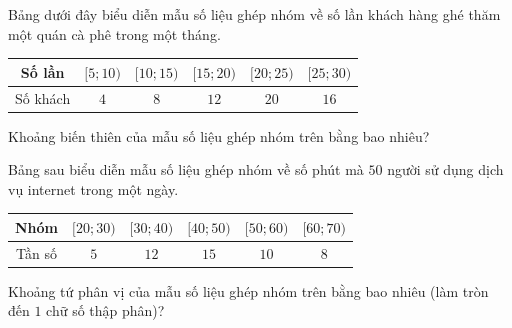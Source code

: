\begin{ex}%
	Bảng dưới đây biểu diễn mẫu số liệu ghép nhóm về số lần khách hàng ghé thăm một quán cà phê trong một tháng.
	\begin{center}
		\begin{tabular}{|c|c|c|c|c|c|}
			\hline Số lần & $[5 ; 10)$ & $[10 ; 15)$ & $[15 ; 20)$ & $[20 ; 25)$ & $[25 ; 30)$ \\
			\hline Số khách & $4$ & $8$ & $12$ & $20$ & $16$ \\
			\hline
		\end{tabular}
	\end{center}
	Khoảng biến thiên của mẫu số liệu ghép nhóm trên bằng bao nhiêu?
\end{ex}

\begin{ex}%
	Bảng sau biểu diễn mẫu số liệu ghép nhóm về số phút mà $50$ người sử dụng dịch vụ internet trong một ngày.
	\begin{center}
		\begin{tabular}{|c|c|c|c|c|c|}
			\hline Nhóm  & $[20 ; 30)$ & $[30 ; 40)$ & $[40 ; 50)$ & $[50 ; 60)$ & $[60 ; 70)$ \\
			\hline Tần số & $5$ & $12$ & $15$ & $10$ & $8$ \\
			\hline
		\end{tabular}
	\end{center}
	Khoảng tứ phân vị của mẫu số liệu ghép nhóm trên bằng bao nhiêu (làm tròn đến $1$ chữ số thập phân)?
\end{ex}


